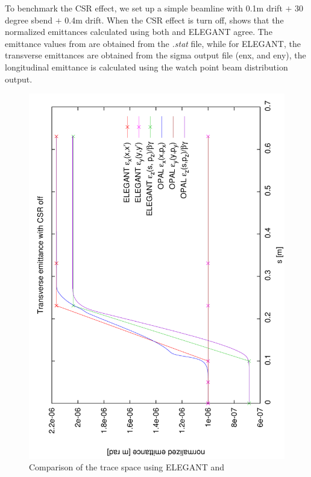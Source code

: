 To benchmark the CSR effect, we set up a simple beamline with 0.1m drift $+$ 30 degree sbend $+$ 0.4m drift. When the CSR effect is turn off,  shows that the normalized emittances calculated using both \opal and ELEGANT agree. The emittance values from \opal are obtained from the {\it .stat} file, while for ELEGANT, the transverse emittances are obtained from the sigma output file (enx, and eny), the longitudinal emittance is calculated using the watch point beam distribution output.
\begin{figure}[!htbp]
\centering
\includegraphics[height=0.5\textwidth-0.6cm, angle = -90, trim = 3mm 0mm 2mm 0mm, clip]{figures/Benchmarks/emit-csr-off}
\caption{Comparison of the trace space using ELEGANT and \opal}
\label{fig:plot-emit-csr-off}
\end{figure}

